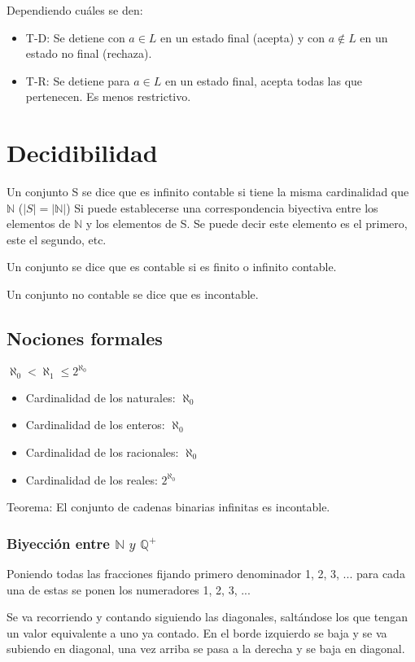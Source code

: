 Dependiendo cuáles se den:
\begin{itemize}
	\item T-D: Se detiene con $a \in L$ en un estado final (acepta) y con $a \notin L$ en un estado no final (rechaza).
	\item T-R: Se detiene para $a \in L$ en un estado final, acepta todas las que pertenecen. Es menos restrictivo.
\end{itemize}

\section{Decidibilidad}
Un conjunto S se dice que es infinito contable si tiene la misma cardinalidad que $\mathbb{N}$ ($|S|=|\mathbb{N}|$) Si puede establecerse una correspondencia biyectiva entre los elementos de $\mathbb{N}$ y los elementos de S. Se puede decir este elemento es el primero, este el segundo, etc.

Un conjunto se dice que es contable si es finito o infinito contable.

Un conjunto no contable se dice que es incontable.

\subsection{Nociones formales}
$\aleph_0 < \aleph_1 \leq 2^{\aleph_0}$
\begin{itemize}
	\item Cardinalidad de los naturales: $\aleph_0$
	\item Cardinalidad de los enteros: $\aleph_0$
	\item Cardinalidad de los racionales: $\aleph_0$
	\item Cardinalidad de los reales: $2^{\aleph_0}$
\end{itemize}

Teorema: El conjunto de cadenas binarias infinitas es incontable.

\subsubsection{Biyección entre $\mathbb{N}\textit{ y }\mathbb{Q}^+$}
Poniendo todas las fracciones fijando primero denominador 1, 2, 3, ... para cada una de estas se ponen los numeradores 1, 2, 3, ...

Se va recorriendo y contando siguiendo las diagonales, saltándose los que tengan un valor equivalente a uno ya contado. En el borde izquierdo se baja y se va subiendo en diagonal, una vez arriba se pasa a la derecha y se baja en diagonal.

